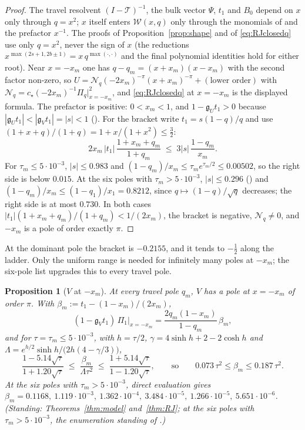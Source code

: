 \documentclass[11pt]{article}
\theoremstyle{plain}
\newtheorem{proposition}[theorem]{Proposition}
\theoremstyle{definition}
\theoremstyle{remark}
\theoremstyle{plain}\newtheorem*{maintheorem}{Main Theorem}
\begin{document}
\begin{proof}
The travel resolvent $(I-\mathcal T)^{-1}$, the bulk vector $\Psi$, $t_1$ and $B_0$ depend on $x$
only through $q=x^2$; $x$ itself enters $\mathcal W(x,q)$ only through the monomials of
\cite[\textup{(eq:app-mu)}--\textup{(eq:app-E)}]{Bonfioli2026bB} and the prefactor $x^{-1}$. The proofs of
Proposition~\ref{prop:shape} and of \eqref{eq:RJclosedq} use only $q=x^2$, never the sign of $x$
(the reductions $x^{\max(2s+1,2b\pm1)}=x\,q^{\max(\cdot,\cdot)}$ and the final polynomial identities
hold for either root). Near $x=-x_m$ one has $q-q_m=(x+x_m)(x-x_m)$ with the second factor
non-zero, so $U=\mathcal N_q(-2x_m)^{-\pi}(x+x_m)^{-\pi}+(\text{lower order})$ with
$\mathcal N_q=c_\star(-2x_m)^{-1}\Pi_q|_{x=-x_m}^2$, and \eqref{eq:RJclosedq} at $x=-x_m$ is the
displayed formula. The prefactor is positive: $0<x_m<1$, and $1-\mathfrak g_Ut_1>0$ because
$|\mathfrak g_Ut_1|<|\mathfrak g_Vt_1|=|s|<1$ ({\cite[Corollary ``the gate closes'', \textup{app:gate}]{Bonfioli2026bB}}). For the bracket write
$t_1=s(1-q)/q$ and use $(1+x+q)/(1+q)=1+x/(1+x^2)\le\tfrac32$:
\[
   2x_m\,|t_1|\,\frac{1+x_m+q_m}{1+q_m}\;\le\;3|s|\,\frac{1-q_m}{x_m}.
\]
For $\tau_m\le5\cdot10^{-3}$, $|s|\le0.983$ and $(1-q_m)/x_m\le\tau_me^{\tau_m/2}\le0.00502$, so the
right side is below $0.015$. At the six poles with $\tau_m>5\cdot10^{-3}$, $|s|\le0.296$
({\cite[Corollary ``the gate closes'', \textup{app:gate}]{Bonfioli2026bB}}) and $(1-q_m)/x_m\le(1-q_1)/x_1=0.8212$, since $q\mapsto(1-q)/\sqrt q$
decreases; the right side is at most $0.730$. In both cases $|t_1|(1+x_m+q_m)/(1+q_m)<1/(2x_m)$, the
bracket is negative, $\mathcal N_q\ne0$, and $-x_m$ is a pole of order exactly $\pi$.
\end{proof}

\noindent At the dominant pole the bracket is $-0.2155$, and it tends to $-\tfrac12$ along the
ladder. Only the uniform range is needed for infinitely many poles at $-x_m$; the six-pole list
upgrades this to every travel pole.

\begin{proposition}[$V$ at $-x_m$]\label{prop:Vminusx}\label{rem:Vminusx}
At every travel pole $q_m$, $V$ has a pole at $x=-x_m$ of order $\pi$. With
$\beta_m:=t_1-(1-x_m)/(2x_m)$,
\[
   (1-\mathfrak g_Vt_1)\,\Pi_1\big|_{x=-x_m}=\frac{2q_m(1-x_m)}{1-q_m}\,\beta_m ,
\]
and for $\tau=\tau_m\le5\cdot10^{-3}$, with $h=\tau/2$, $\gamma=4\sinh h+2-2\cosh h$ and
$\Lambda=e^{h/2}\sinh h/\bigl(2h(4-\gamma/3)\bigr)$,
\[
   \frac{1-5.14\sqrt\tau}{1+1.20\sqrt\tau}\;\le\;\frac{\beta_m}{\Lambda\tau^2}\;\le\;
   \frac{1+5.14\sqrt\tau}{1-1.20\sqrt\tau},
   \qquad\text{so}\qquad 0.073\,\tau^2\le\beta_m\le0.187\,\tau^2 .
\]
At the six poles with $\tau_m>5\cdot10^{-3}$, direct evaluation gives
$\beta_m=0.1168,\ 1.119\cdot10^{-3},\ 1.362\cdot10^{-4},\ 3.484\cdot10^{-5},\ 1.266\cdot10^{-5},\
5.651\cdot10^{-6}$.
\textup{(}Standing: Theorems~\ref{thm:model} and~\ref{thm:RJ}; at the six poles with
$\tau_m>5\cdot10^{-3}$, the enumeration standing of {\cite[Theorem ``the amplitude estimate $(\star)$'', \textup{thm:star}]{Bonfioli2026bB}}.\textup{)}
\end{proposition}
\end{document}
